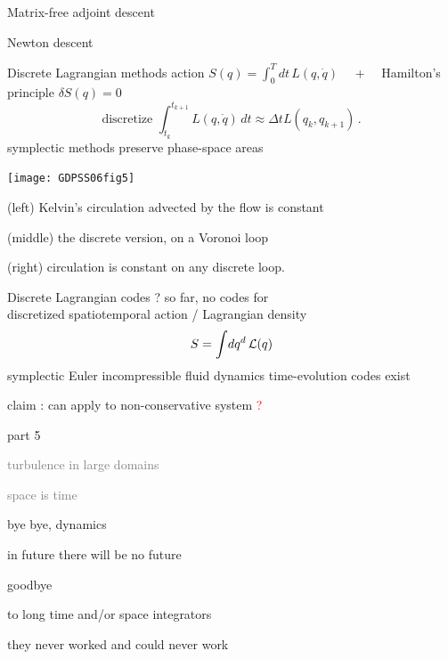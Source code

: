 \begin{frame}{Matrix-free adjoint descent}
\end{frame}

\begin{frame}{Newton descent}
\end{frame}

\begin{frame}{Discrete {Lagrangian} methods}
action
\(
S(q)=\int_0^T \!dt\, L(q,\dot{q})
\)
~~+~~
Hamilton’s principle
\(
\delta S(q)=0
\)
\[
\mbox{discretize  }
\int_{t_k}^{t_{k+1}} L(q,\dot{q})\,dt
    \approx
{\Delta t} L(q_k,q_{k+1})
\,.
\]
symplectic methods preserve phase-space areas

    \texttt{[image: GDPSS06fig5]}

(left) Kelvin's circulation
advected by the flow is constant

(middle) the discrete version, on a Voronoi loop

(right) circulation is constant on any discrete loop.
\end{frame}

\begin{frame}{Discrete {Lagrangian} codes ?}
so far, no codes for \\
discretized spatiotemporal action / Lagrangian density
\[
S =\int\!dq^d\, {\cal L}(q)
\]
symplectic Euler incompressible fluid dynamics
time-evolution codes exist

claim : can apply to  non-conservative system
\vfill\hfill \textcolor{red}{\NS ?}
\end{frame}

\begin{frame}{part 5}
\begin{enumerate}
              \item
    \textcolor{gray}{\small
turbulence in large domains
              \item
space is time
    }
              \item
    {\Large
bye bye, dynamics
    }
            \end{enumerate}
\end{frame}

\begin{frame}{in future there will be no future}
\begin{center}
{\huge goodbye}
\end{center}

\vfill

to long time and/or space integrators

\medskip

\hfill they never worked and could never work
\end{frame}

